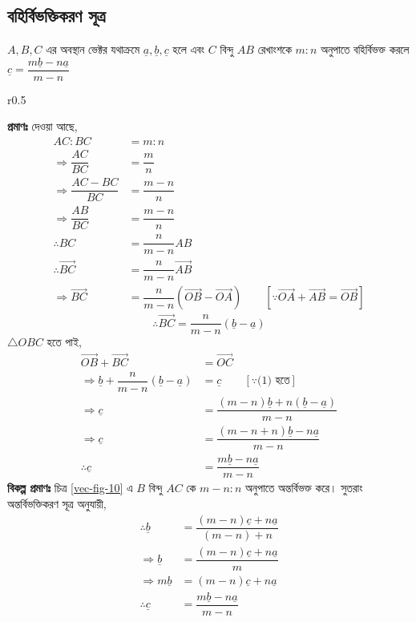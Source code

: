 \subsection*{বহির্বিভক্তিকরণ সূত্র}
\begin{tcolorbox}[colback=green!5!white,colframe=green!75!black]
	$A, B, C$ এর অবস্থান ভেক্টর যথাক্রমে $\underline{a}, \underline{b}, \underline{c}$ হলে এবং $C$ বিন্দু $AB$ রেখাংশকে $m:n$ অনুপাতে বহির্বিভক্ত করলে $\underline{c}=\dfrac{m\underline{b}-n\underline{a}}{m-n}$
\end{tcolorbox}
\begin{wrapfigure}[5]{r}{0.5\textwidth}
	\begin{center}
		
	\end{center}
	\caption{বহির্বিভক্তিকরণ সূত্র}
	\label{vec-fig-10}
\end{wrapfigure}
\textbf{প্রমাণঃ} দেওয়া আছে, 
\begin{align*}
	AC:BC &= m:n \\
	\Rightarrow \dfrac{AC}{BC} &= \dfrac{m}{n} \\
	\Rightarrow \dfrac{AC-BC}{BC} &= \dfrac{m-n}{n} \\
	\Rightarrow \dfrac{AB}{BC} &= \dfrac{m-n}{n} \\
	\therefore BC &= \dfrac{n}{m-n}AB \\
	\therefore \overrightarrow{BC} &= \dfrac{n}{m-n}\overrightarrow{AB} \\
	\Rightarrow \overrightarrow{BC} &= \dfrac{n}{m-n}(\overrightarrow{OB}-\overrightarrow{OA}) \quad \quad [\because \overrightarrow{OA}+\overrightarrow{AB}=\overrightarrow{OB}]
\end{align*}
\begin{equation}
	\therefore \overrightarrow{BC} = \dfrac{n}{m-n}(\underline{b}-\underline{a}) \tag{1}
\end{equation}
$\triangle OBC$ হতে পাই,
\begin{align*}
	\overrightarrow{OB}+\overrightarrow{BC} &= \overrightarrow{OC} \\
	\Rightarrow \underline{b}+\dfrac{n}{m-n}(\underline{b}-\underline{a}) &= \underline{c} \quad \quad [\because \text{(1) হতে}]\\
	\Rightarrow \underline{c} &= \dfrac{(m-n)\underline{b}+n(\underline{b}-\underline{a})}{m-n} \\
	\Rightarrow \underline{c} &= \dfrac{(m-n+n)\underline{b}-n\underline{a}}{m-n} \\
	\therefore \underline{c} &= \dfrac{m\underline{b}-n\underline{a}}{m-n}
\end{align*}
\newpage
\textbf{বিকল্প প্রমাণঃ} চিত্র \ref{vec-fig-10} এ $B$ বিন্দু $AC$ কে $m-n:n$ অনুপাতে অন্তর্বিভক্ত করে। সুতরাং অন্তর্বিভক্তিকরণ সূত্র অনুযায়ী, 
\begin{align*}
	\therefore \underline{b} &= \dfrac{(m-n)\underline{c}+n\underline{a}}{(m-n)+n} \\
	\Rightarrow \underline{b} &= \dfrac{(m-n)\underline{c}+n\underline{a}}{m} \\
	\Rightarrow m\underline{b} &= (m-n)\underline{c}+n\underline{a} \\
	\therefore \underline{c} &= \dfrac{m\underline{b}-n\underline{a}}{m-n}
\end{align*}